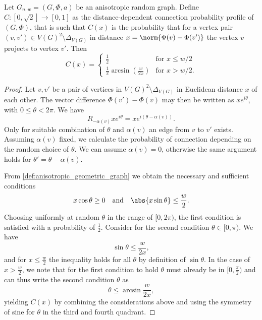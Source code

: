 \begin{theorem} \label{theorem:distance_prof} Let $G_{n,w} = (G,\Phi,
  a)$ be an anisotropic random graph. Define $C:[0,\sqrt{2}] \to
  [0,1]$ as the distance-dependent connection probability profile of
  $(G,\Phi)$, that is such that $C(x)$ is the probability that for a
  vertex pair $(v,v') \in V(G)^2\setminus\Delta_{V(G)}$ in distance $x
  = \norm{\Phi(v)-\Phi(v')}$ the vertex $v$ projects to vertex
  $v'$. Then
  \[
    C(x) = \begin{cases}%
             \frac{1}{2} & \mathrm{for} \,\, x\le w/2 \\
             \frac{1}{\pi}
             \operatorname{arcsin}\left(\frac{w}{2x}\right) &
             \mathrm{for} \,\, x >  w/2. %
           \end{cases}
  \]
\end{theorem} 

\begin{proof}
  Let $v,v'$ be a pair of vertices in $V(G)^2 \setminus \Delta_{V(G)}$
  in Euclidean distance $x$ of each other. The vector difference
  $\Phi(v')-\Phi(v)$ may then be written as $x e^{i\theta}$, with $0
  \leq \theta < 2\pi$. We have 
  \[
    R_{-\alpha(v)} xe^{i\theta} = xe^{i(\theta - \alpha(v))}.
  \]
  Only for suitable combination of $\theta$ and $\alpha(v)$ an edge
  from $v$ to $v'$ exists. Assuming $\alpha(v)$ fixed, we calculate
  the probability of connection depending on the random choice of
  $\theta$. We can assume $\alpha(v) = 0$, otherwise the same argument
  holds for $\theta' = \theta - \alpha(v)$.

  From \ref{def:anisotropic_geometric_graph} we obtain the necessary and
  sufficient conditions
  \[
   x \cos \theta \geq 0 \quad \mathrm{and} \quad \abs{x\sin \theta}
  \leq \frac{w}{2}.
  \]
  Choosing uniformly at random $\theta$ in the range of $[0,2\pi)$,
  the first condition is satisfied with a probability of
  $\frac{1}{2}$. Consider for the second condition $\theta \in
  [0,\pi)$. We have 
  \[ 
  \sin \theta \leq \frac{w}{2x},
  \]
  and for $x \leq \frac{w}{2}$ the inequality holds for all $\theta$
  by definition of $\sin \theta$. In the case of $x > \frac{w}{2}$, we
  note that for the first condition to hold $\theta$ must already be in
  $[0,\frac{\pi}{2})$ and can thus write the second condition $\theta$ as
  \[
    \theta \leq \operatorname{arcsin}\frac{w}{2x},
  \]
  yielding $C(x)$ by combining the considerations above and using the
  symmetry of sine for $\theta$ in the third and fourth quadrant.
\end{proof}

